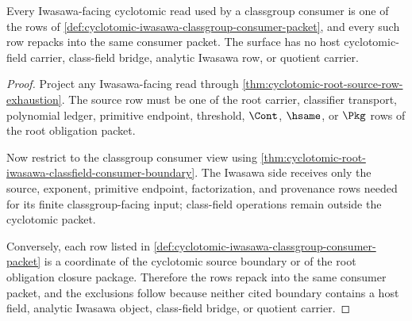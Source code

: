 \begin{theorem}
\label{thm:cyclotomic-iwasawa-classgroup-consumer-exhaustion}
Every Iwasawa-facing cyclotomic read used by a classgroup consumer is one of
the rows of
\autoref{def:cyclotomic-iwasawa-classgroup-consumer-packet}, and every such
row repacks into the same consumer packet. The surface has no host
cyclotomic-field carrier, class-field bridge, analytic Iwasawa row, or
quotient carrier.
\end{theorem}
\begin{proof}
Project any Iwasawa-facing read through
\autoref{thm:cyclotomic-root-source-row-exhaustion}. The source row must be
one of the root carrier, classifier transport, polynomial ledger, primitive
endpoint, threshold, $\Cont$, $\hsame$, or $\Pkg$ rows of the root obligation
packet.

Now restrict to the classgroup consumer view using
\autoref{thm:cyclotomic-root-iwasawa-classfield-consumer-boundary}. The
Iwasawa side receives only the source, exponent, primitive endpoint,
factorization, and provenance rows needed for its finite classgroup-facing
input; class-field operations remain outside the cyclotomic packet.

Conversely, each row listed in
\autoref{def:cyclotomic-iwasawa-classgroup-consumer-packet} is a coordinate of
the cyclotomic source boundary or of the root obligation closure package.
Therefore the rows repack into the same consumer packet, and the exclusions
follow because neither cited boundary contains a host field, analytic
Iwasawa object, class-field bridge, or quotient carrier.
\end{proof}
